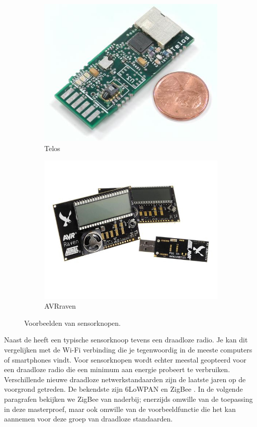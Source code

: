 \begin{figure}[ht]
\begin{subfigure}{.24\textwidth}
  \includegraphics[width=.9\linewidth]{./resources/telos.jpg}
  \caption{Telos}
  \label{fig:telos}
\end{subfigure}
\begin{subfigure}{.24\textwidth}
  \centering
  \includegraphics[width=.9\linewidth]{./resources/raven.jpg}
  \caption{AVRraven}
  \label{fig:raven}
\end{subfigure}
\caption{Voorbeelden van sensorknopen.}
\label{fig:motes}
\end{figure}

Naast de \mcu heeft een typische sensorknoop tevens een draadloze radio. Je kan
dit vergelijken met de Wi-Fi verbinding die je tegenwoordig in de meeste
computers of smartphones vindt. Voor sensorknopen wordt echter meestal
geopteerd voor een draadloze radio die een minimum aan energie probeert te
verbruiken. Verschillende nieuwe draadloze netwerkstandaarden zijn de laatste
jaren op de voorgrond getreden. De bekendste zijn 6LoWPAN \citep{rfc:6282} en
ZigBee \citep{alliance2012zigbee}. In de volgende paragrafen bekijken we ZigBee
van naderbij; enerzijds omwille van de toepassing in deze masterproef, maar ook
omwille van de voorbeeldfunctie die het kan aannemen voor deze groep van
draadloze standaarden.

